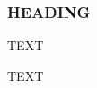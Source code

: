 \documentclass[journal abbreviation, manuscript]{copernicus}
\begin{document}
\subsubsection{HEADING}
TEXT


\conclusions  %
TEXT












\appendix
\section{}    %

\subsection{}     %


\noappendix       %



\end{document}
